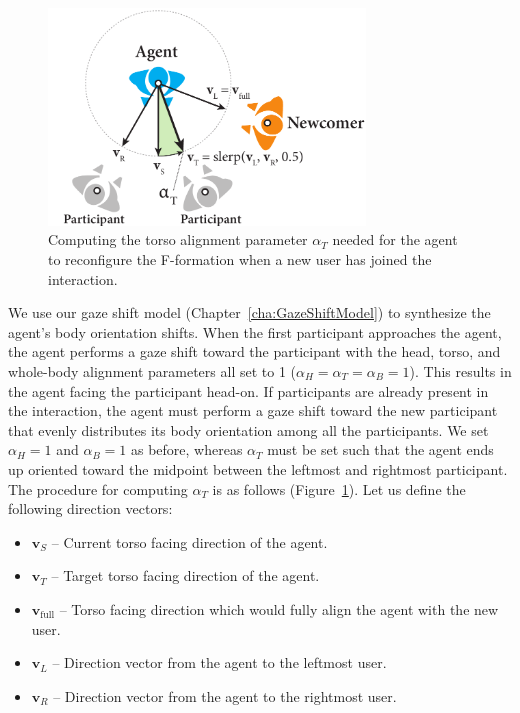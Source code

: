 \begin{figure}
\centering
\includegraphics[width=0.75\textwidth]{conversationalrolegaze/Figures/FTorsoAlign.pdf}
\caption{Computing the torso alignment parameter $\alpha_T$ needed for the agent to reconfigure the F-formation when a new user has joined the interaction.}
\label{fig:FTorsoAlign}
\end{figure}

We use our gaze shift model (Chapter~\ref{cha:GazeShiftModel}) to synthesize the agent's body orientation shifts. When the first participant approaches the agent, the agent performs a gaze shift toward the participant with the head, torso, and whole-body alignment parameters all set to 1 ($\alpha_H = \alpha_T = \alpha_B = 1$). This results in the agent facing the participant head-on. If participants are already present in the interaction, the agent must perform a gaze shift toward the new participant that evenly distributes its body orientation among all the participants. We set $\alpha_H = 1$ and $\alpha_B = 1$ as before, whereas $\alpha_T$ must be set such that the agent ends up oriented toward the midpoint between the leftmost and rightmost participant. The procedure for computing $\alpha_T$ is as follows (Figure~\ref{fig:FTorsoAlign}). Let us define the following direction vectors:

\begin{itemize}
\item $\mathbf{v}_S$ -- Current torso facing direction of the agent.
\item $\mathbf{v}_T$ -- Target torso facing direction of the agent.
\item $\mathbf{v}_\mathrm{full}$ -- Torso facing direction which would fully align the agent with the new user.
\item $\mathbf{v}_L$ -- Direction vector from the agent to the leftmost user.
\item $\mathbf{v}_R$ -- Direction vector from the agent to the rightmost user.
\end{itemize}

